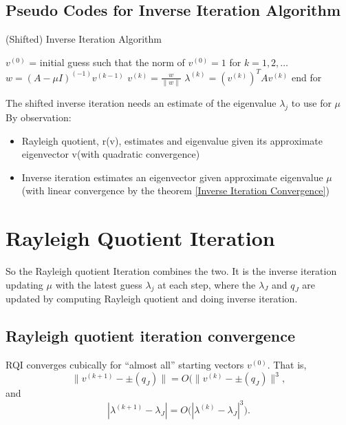 \subsection{Pseudo Codes for Inverse Iteration Algorithm}
 \begin{algorithm}
    \caption{(Shifted) Inverse Iteration Algorithm}
    \begin{algorithmic}
        \STATE \( v^{(0)} \) = initial guess such that the norm of \( v^{(0)} = 1 \)
        \STATE for \( k = 1, 2, \dots \)
        \STATE \quad \( w = (A-\mu I)^{(-1)} v^{(k-1)} \)
        \STATE \quad \( v^{(k)} = \frac{w}{\|w\|} \)
        \STATE \quad \( \lambda^{(k)} = (v^{(k)})^T A v^{(k)} \)
        \STATE end for
    \end{algorithmic}
\end{algorithm}
The shifted inverse iteration needs an estimate of the eigenvalue $\lambda_j$ to use for $\mu$
By observation:
\begin{itemize}
    \item Rayleigh quotient, r(v), estimates and eigenvalue given its approximate eigenvector v(with quadratic convergence)
    \item Inverse iteration estimates an eigenvector given approximate  eigenvalue $\mu$ (with linear convergence by the theorem \ref{Inverse Iteration Convergence})
\end{itemize}
\section{Rayleigh Quotient Iteration}
\label{Section Rayleigh Quotient Iteration}
So the Rayleigh quotient Iteration combines the two. It is the inverse iteration updating $\mu$ with the latest guess $\lambda_j$ at each step, where the $\lambda_J$ and $q_J$ are updated by computing Rayleigh quotient and doing inverse iteration.
\subsection{Rayleigh quotient iteration convergence}
\begin{theorem}
    RQI converges cubically for “almost all” starting vectors \(v^{(0)}\). That is,
\[
\|v^{(k+1)} - \pm (q_J)\| = O\big(\|v^{(k)} - \pm (q_J)\|^3,
\]
and
\[
|\lambda^{(k+1)} - \lambda_J| = O\big(|\lambda^{(k)} - \lambda_J|^3\big).
\]
\end{theorem}
